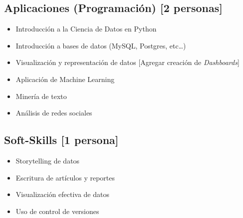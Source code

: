 \documentclass{article}
\begin{document}
        \subsection{Aplicaciones (Programación) [2 personas]}
            
            \begin{itemize}
                \item Introducción a la Ciencia de Datos en Python
                \item Introducción a bases de datos (MySQL, Postgres, etc\dots)
                \item Visualización y representación de datos [Agregar creación de \emph{Dashboards}]
                \item Aplicación de Machine Learning
                \item Minería de texto
                \item Análisis de redes sociales
            \end{itemize}

        \subsection{Soft-Skills [1 persona]}

            \begin{itemize}
                \item Storytelling de datos
                \item Escritura de artículos y reportes
                \item Visualización efectiva de datos
                \item Uso de control de versiones
            \end{itemize}
            
\end{document}
